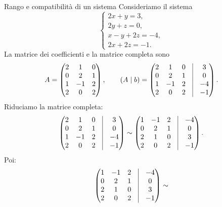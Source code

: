 \documentclass[a4paper]{article}
\begin{document}
\begin{snippetexample}{Rango e compatibilità di un sistema}
    Consideriamo il sistema
    \[
        \begin{cases}
            2x+y=3,\\
            2y+z=0,\\
            x-y+2z=-4,\\
            2x+2z=-1.
        \end{cases}
    \]
    La matrice dei coefficienti e la matrice completa sono
    \[
        A=
        \begin{pmatrix}
            2 & 1 & 0\\
            0 & 2 & 1\\
            1 & -1 & 2\\
            2 & 0 & 2
        \end{pmatrix},
        \qquad
        (A\mid b)=
        \begin{pmatrix}
            2 & 1 & 0 & \vline & 3\\
            0 & 2 & 1 & \vline & 0\\
            1 & -1 & 2 & \vline & -4\\
            2 & 0 & 2 & \vline & -1
        \end{pmatrix}.
    \]
    Riduciamo la matrice completa:
    \[
        \begin{pmatrix}
            2 & 1 & 0 & \vline & 3\\
            0 & 2 & 1 & \vline & 0\\
            1 & -1 & 2 & \vline & -4\\
            2 & 0 & 2 & \vline & -1
        \end{pmatrix}
        \sim
        \begin{pmatrix}
            1 & -1 & 2 & \vline & -4\\
            0 & 2 & 1 & \vline & 0\\
            2 & 1 & 0 & \vline & 3\\
            2 & 0 & 2 & \vline & -1
        \end{pmatrix}.
    \]
    Poi:
    \[
        \begin{pmatrix}
            1 & -1 & 2 & \vline & -4\\
            0 & 2 & 1 & \vline & 0\\
            2 & 1 & 0 & \vline & 3\\
            2 & 0 & 2 & \vline & -1
        \end{pmatrix}
        \sim
\]
\end{snippetexample}
\end{document}
